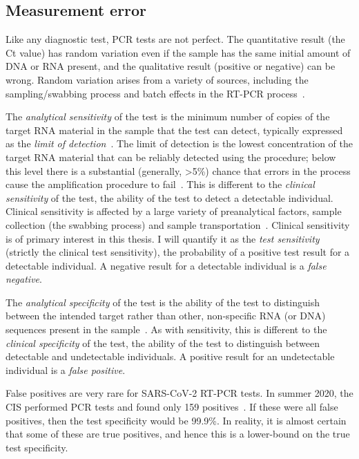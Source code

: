 \documentclass[thesis.tex]{subfiles}
\begin{document}
\subsection{Measurement error} \label{biology-data:sec:measurement-error}

Like any diagnostic test, PCR tests are not perfect.
The quantitative result (the Ct value) has random variation even if the sample has the same initial amount of DNA or RNA present, and the qualitative result (positive or negative) can be wrong.
Random variation arises from a variety of sources, including the sampling/swabbing process and batch effects in the RT-PCR process~\autocite{hanRTPCR}.

The \emph{analytical sensitivity} of the test is the minimum number of copies of the target RNA material in the sample that the test can detect, typically expressed as the \emph{limit of detection}~\autocite{bustinMIQE}.
The limit of detection is the lowest concentration of the target RNA material that can be reliably detected using the procedure; below this level there is a substantial (generally, >5\%) chance that errors in the process cause the amplification procedure to fail~\autocite{forootanLOD}.
This is different to the \emph{clinical sensitivity} of the test, the ability of the test to detect a detectable individual.
Clinical sensitivity is affected by a large variety of preanalytical factors, \eg sample collection (\ie the swabbing process) and sample transportation~\autocite{lippiPotential}.
Clinical sensitivity is of primary interest in this thesis.
I will quantify it as the \emph{test sensitivity} (strictly the clinical test sensitivity), the probability of a positive test result for a detectable individual.
A negative result for a detectable individual is a \emph{false negative}.

The \emph{analytical specificity} of the test is the ability of the test to distinguish between the intended target rather than other, non-specific RNA (or DNA) sequences present in the sample~\autocite{bustinMIQE}.
As with sensitivity, this is different to the \emph{clinical specificity} of the test, the ability of the test to distinguish between detectable and undetectable individuals.
A positive result for an undetectable individual is a \emph{false positive}.

False positives are very rare for SARS-CoV-2 RT-PCR tests.
In summer 2020, the CIS performed  PCR tests and found only 159 positives~\autocite[section 5]{cisMethodsONS}.
If these were all false positives, then the test specificity would be 99.9\%.
In reality, it is almost certain that some of these are true positives, and hence this is a lower-bound on the true test specificity.
\end{document}
